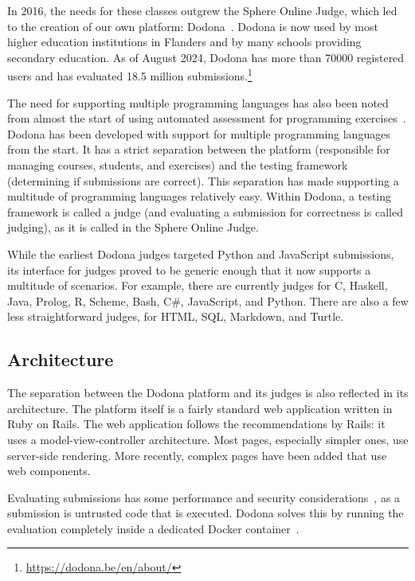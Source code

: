 \documentclass[../main]{subfiles}
\begin{document}
In 2016, the needs for these classes outgrew the Sphere Online Judge, which led to the creation of our own platform: Dodona~\autocite{vanpetegemDodonaLearnCode2023}.
Dodona is now used by most higher education institutions in Flanders and by many schools providing secondary education.
As of August 2024, Dodona has more than \num{70000} registered users and has evaluated 18.5 million submissions.\footnote{\url{https://dodona.be/en/about/}}

The need for supporting multiple programming languages has also been noted from almost the start of using automated assessment for programming exercises~\autocite{hextAutomaticGradingScheme1969}.
Dodona has been developed with support for multiple programming languages from the start.
It has a strict separation between the platform (responsible for managing courses, students, and exercises) and the testing framework (determining if submissions are correct).
This separation has made supporting a multitude of programming languages relatively easy.
Within Dodona, a testing framework is called a judge (and evaluating a submission for correctness is called judging), as it is called in the Sphere Online Judge.

While the earliest Dodona judges targeted Python and JavaScript submissions, its interface for judges proved to be generic enough that it now supports a multitude of scenarios.
For example, there are currently judges for C, Haskell, Java, Prolog, R, Scheme, Bash, C\#, JavaScript, and Python.
There are also a few less straightforward judges, for HTML, SQL, Markdown, and Turtle.

\subsection{Architecture}\label{subsec:architecture}

The separation between the Dodona platform and its judges is also reflected in its architecture.
The platform itself is a fairly standard web application written in Ruby on Rails.
The web application follows the recommendations by Rails: it uses a model-view-controller architecture.
Most pages, especially simpler ones, use server-side rendering.
More recently, complex pages have been added that use web components.

Evaluating submissions has some performance and security considerations~\autocite{wasikSurveyOnlineJudge2018}, as a submission is untrusted code that is executed.
Dodona solves this by running the evaluation completely inside a dedicated Docker container~\autocite{pevelerComparingJailedSandboxes2019}.
\end{document}
